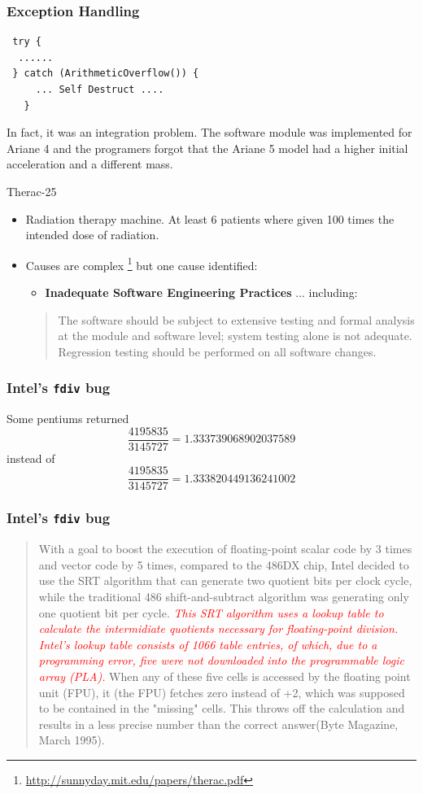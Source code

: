 \documentclass{beamer}
\begin{document}
\begin{frame}[fragile]
  \frametitle{Exception Handling}
\begin{lstlisting}
 try {
  ......
 } catch (ArithmeticOverflow()) {
     ... Self Destruct .... 
   } 
\end{lstlisting}
In fact, it was an integration problem. The software module was implemented for
Ariane 4 and the programers  forgot that the Ariane 5 model had a higher initial
acceleration and a different mass.  
\end{frame}
\begin{frame}{Therac-25}
  \begin{itemize}
  \item  Radiation therapy machine. At least 6 patients where given
    100 times the intended dose of radiation. 
  \item Causes are complex
    \footnote{\url{http://sunnyday.mit.edu/papers/therac.pdf}} but one
    cause identified:
    \begin{itemize}
    \item      {\bf Inadequate Software Engineering Practices} ... including:
    \end{itemize}
    \begin{quote}
     The software should be subject to extensive testing and formal
     analysis at the module and software level; system testing alone
     is not adequate.  Regression testing should be performed on all
     software changes. 
    \end{quote}
  \end{itemize}  
\end{frame}
\begin{frame}
  \frametitle{Intel's {\tt fdiv} bug}
   
Some pentiums returned
\[
\frac{4195835}{3145727} = 1.333739068902037589
\]
instead of 
\[
\frac{4195835}{3145727} = 1.333820449136241002
\]

\end{frame}
\begin{frame}
  \frametitle{Intel's {\tt fdiv} bug}
  \begin{quote}
    With a goal to boost the execution of floating-point scalar code by 3
    times and vector code by 5 times, compared to the 486DX chip, Intel
    decided to use the SRT algorithm that can generate two quotient bits per
    clock cycle, while the traditional 486 shift-and-subtract algorithm was
    generating only one quotient bit per cycle. \textcolor{red}{\em This SRT
      algorithm uses a lookup table to calculate the intermidiate quotients
      necessary for floating-point division. Intel's lookup table consists of
      1066 table entries, of which, due to a programming error, five were not
      downloaded into the programmable logic array (PLA).} When any of these
    five cells is accessed by the floating point unit (FPU), it (the FPU)
    fetches zero instead of +2, which was supposed to be contained in the
    "missing" cells. This throws off the calculation and results in a less
    precise number than the correct answer(Byte Magazine, March 1995).
  \end{quote}
\end{frame}
\end{document}
